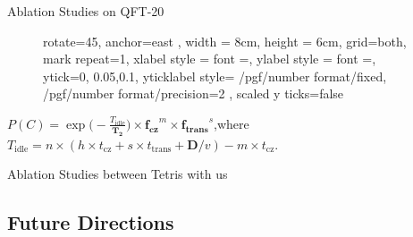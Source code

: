 \begin{frame}{Ablation Studies on QFT-20}
\begin{figure}
{{{                rotate=45,
                anchor=east
            },
            width = 8cm,
            height = 6cm,
            grid=both,
            mark repeat=1,
            xlabel style = {font =\Large},
            ylabel style = {font =\Large}, 
            ytick={0, 0.05,0.1},
            yticklabel style={
            /pgf/number format/fixed,
            /pgf/number format/precision=2
            },
            scaled y ticks=false
        }
    }
    \begin{minipage}[b]{0.45\textwidth}
            \centering
            \scalebox{0.5}{}
        \end{minipage}
        \hfill
        \begin{minipage}[b]{0.45\textwidth}
            \centering
            \scalebox{0.5}{}
        \end{minipage}

        \begin{minipage}[b]{0.45\textwidth}
            \centering
            \scalebox{0.5}{}
        \end{minipage}
        \hfill
        \begin{minipage}[b]{0.45\textwidth}
            \centering
            \scalebox{0.5}{}
        \end{minipage}
\end{figure}
\centering
$P(C) = \exp\bigg(\!-\frac{T_{\text{idle}}}{\bm{T_2}}\bigg) \times \bm{f_\text{cz}}^m \times \bm{f_\text{trans}}^{s}$,where $T_\text{idle}=n\times (h\times t_\text{cz}+s\times t_\text{trans}+\bm{D}/v) - m\times t_\text{cz}$.
\end{frame}

\begin{frame}{Ablation Studies between Tetris with us}
\begin{figure}
    \centering
    \scalebox{0.8}{}
\end{figure}
\end{frame}
\subsection{Future Directions}

